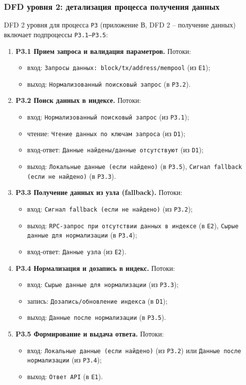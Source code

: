 ﻿\documentclass[14pt,a4paper]{extarticle}
\begin{document}
\subsubsection{DFD уровня 2: детализация процесса получения данных}
\noindent DFD 2 уровня для процесса \texttt{P3} (приложение В, DFD 2 -- получение данных) включает подпроцессы \texttt{P3.1--P3.5}:
\begin{enumerate}
  \item \textbf{P3.1 Прием запроса и валидация параметров.}
  Потоки:
  \begin{itemize}
    \item вход: \texttt{Запросы данных: block/tx/address/mempool} (из \texttt{E1});
    \item выход: \texttt{Нормализованный поисковый запрос} (в \texttt{P3.2}).
  \end{itemize}
  \item \textbf{P3.2 Поиск данных в индексе.}
  Потоки:
  \begin{itemize}
    \item вход: \texttt{Нормализованный поисковый запрос} (из \texttt{P3.1});
    \item чтение: \texttt{Чтение данных по ключам запроса} (из \texttt{D1});
    \item вход-ответ: \texttt{Данные найдены/данные отсутствуют} (из \texttt{D1});
    \item выход: \texttt{Локальные данные (если найдено)} (в \texttt{P3.5}), \texttt{Сигнал fallback (если не найдено)} (в \texttt{P3.3}).
  \end{itemize}
  \item \textbf{P3.3 Получение данных из узла (fallback).}
  Потоки:
  \begin{itemize}
    \item вход: \texttt{Сигнал fallback (если не найдено)} (из \texttt{P3.2});
    \item выход: \texttt{RPC-запрос при отсутствии данных в индексе} (в \texttt{E2}), \texttt{Сырые данные для нормализации} (в \texttt{P3.4});
    \item вход-ответ: \texttt{Данные узла} (из \texttt{E2}).
  \end{itemize}
  \item \textbf{P3.4 Нормализация и дозапись в индекс.}
  Потоки:
  \begin{itemize}
    \item вход: \texttt{Сырые данные для нормализации} (из \texttt{P3.3});
    \item запись: \texttt{Дозапись/обновление индекса} (в \texttt{D1});
    \item выход: \texttt{Данные после нормализации} (в \texttt{P3.5}).
  \end{itemize}
  \item \textbf{P3.5 Формирование и выдача ответа.}
  Потоки:
  \begin{itemize}
    \item вход: \texttt{Локальные данные (если найдено)} (из \texttt{P3.2}) или \texttt{Данные после нормализации} (из \texttt{P3.4});
    \item выход: \texttt{Ответ API} (в \texttt{E1}).
  \end{itemize}
\end{enumerate}
\end{document}
